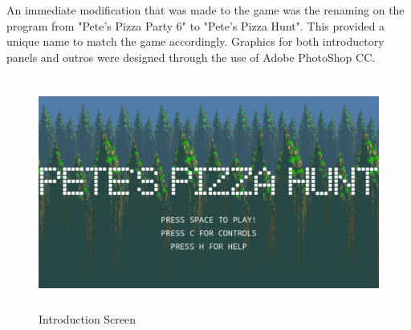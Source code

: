 \documentclass{article}
\begin{document}
An immediate modification that was made to the game was the renaming on the program from "Pete's Pizza Party 6" to "Pete's Pizza Hunt". This provided a unique name to match the game accordingly. Graphics for both introductory panels and outros were designed through the use of Adobe PhotoShop CC.
\begin{figure}[H]
    \centering
    \includegraphics[height=3in]{intro.png}
    \caption[Introduction Screen]{Introduction Screen}
    \label{fig:flowchart}
\end{figure}
\end{document}
